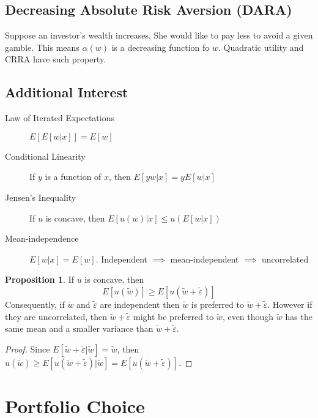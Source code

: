 \documentclass[11pt, a4paper, oneside]{article}
\theoremstyle{definition}
\newtheorem{myprop}{Proposition}
\theoremstyle{proposition}
\theoremstyle{corollary}
\theoremstyle{lemma}
\theoremstyle{theorem}
\begin{document}
\subsection{Decreasing Absolute Risk Aversion (DARA)}
Suppose an investor's wealth increases, She would like to pay less to avoid a given gamble. This means $\alpha(w)$ is a decreasing function fo $w$. Quadratic utility and CRRA have such property. 

\subsection{Additional Interest}
\begin{description}
\item[Law of Iterated Expectations] $E[E[w|x]] = E[w]$ 
\item[Conditional Linearity] If $y$ is a function of $x$, then $E[yw|x]= yE[w|x]$
\item[Jensen's Inequality] If $u$ is concave, then $E[u(w)|x] \leq u(E[w|x])$
\item[Mean-independence] $E[w|x] = E[w]$. Independent $\implies$ mean-independent $\implies$ uncorrelated
\end{description}

\begin{myprop}
If $u$ is concave, then
$$E[u(\tilde{w})] \geq E[u(\tilde{w}+\tilde{\varepsilon})]$$
Consequently, if $\tilde{w}$ and $\tilde{\varepsilon}$ are independent then $\tilde{w}$ is preferred to $\tilde{w}+\tilde{\varepsilon}$. However if they are uncorrelated, then $\tilde{w}+\tilde{\varepsilon}$ might be preferred to $\tilde{w}$, even though $\tilde{w}$ has the same mean and a smaller variance than $\tilde{w}+\tilde{\varepsilon}$. 
\end{myprop}
\begin{proof}
Since $E[\tilde{w}+\tilde{\varepsilon}|\tilde{w}] = \tilde{w}$, then $u(\tilde{w}) \geq E[u(\tilde{w}+\tilde{\varepsilon})|\tilde{w}] = E[u(\tilde{w}+\tilde{\varepsilon})]$.
\end{proof}

\section{Portfolio Choice}
\end{document}
